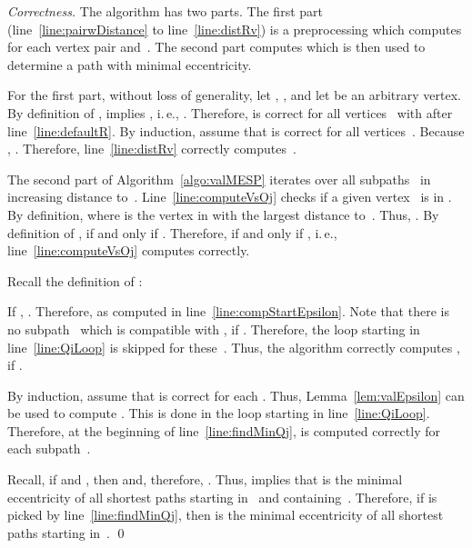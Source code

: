 \documentclass[10pt]{llncs}
\makeatletter
\newcommand{\ie}{i.\,e.\@ifnextchar{,}{}{~}}
\makeatother
\begin{document}
\begin{proof}
    [Correctness]
The algorithm has two parts.
The first part (line~\ref{line:pairwDistance} to line~\ref{line:distRv}) is a preprocessing which computes  for each vertex pair  and~.
The second part computes  which is then used to determine a path with minimal eccentricity.

For the first part, without loss of generality, let , , and let  be an arbitrary vertex.
By definition of ,  implies , \ie, .
Therefore,  is correct for all vertices~ with  after line~\ref{line:defaultR}.
By induction, assume that  is correct for all vertices~.
Because , .
Therefore, line~\ref{line:distRv} correctly computes~.

The second part of Algorithm~\ref{algo:valMESP} iterates over all subpaths~ in increasing distance to~.
Line~\ref{line:computeVsOj} checks if a given vertex~ is in .
By definition,  where  is the vertex in  with the largest distance to~.
Thus, .
By definition of ,  if and only if .
Therefore,  if and only if , \ie, line~\ref{line:computeVsOj} computes  correctly.

Recall the definition of :

If , .
Therefore,  as computed in line~\ref{line:compStartEpsilon}.
Note that there is no subpath~ which is compatible with , if .
Therefore, the loop starting in line~\ref{line:QiLoop} is skipped for these~.
Thus, the algorithm correctly computes , if .

By induction, assume that  is correct for each .
Thus, Lemma~\ref{lem:valEpsilon} can be used to compute .
This is done in the loop starting in line~\ref{line:QiLoop}.
Therefore, at the beginning of line~\ref{line:findMinQj},  is computed correctly for each subpath~.

Recall, if  and , then  and, therefore, .
Thus,  implies that  is the minimal eccentricity of all shortest paths starting in~ and containing~.
Therefore, if  is picked by line~\ref{line:findMinQj}, then  is the minimal eccentricity of all shortest paths starting in~.
\qed
\end{proof}
\end{document}
